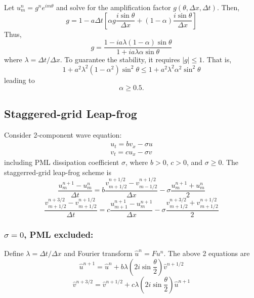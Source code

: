 Let $u_m^n=g^n e^{im\theta}$ and solve for the amplification factor $g(\theta,\Delta x, \Delta t)$. Then,
\begin{equation}
 g=1-a\Delta t \left[
 \alpha g \frac{i\sin\theta}{\Delta x}+(1-\alpha)\frac{i\sin\theta}{\Delta x}
 \right]
\end{equation}
Thus,
\begin{equation}
 g=\frac{1-ia\lambda(1-\alpha)\sin\theta}{1+ia\lambda\alpha\sin\theta}
\end{equation}
where $\lambda=\Delta t/\Delta x$. To guarantee the stability, it requires $|g|\leq 1$. That is,
\begin{equation}
 1+a^2\lambda^2(1-\alpha^2)\sin^2\theta \leq 1+a^2 \lambda^2\alpha^2\sin^2\theta
\end{equation}
leading to
\begin{equation}
 \alpha\geq 0.5.
\end{equation}


\subsection{Staggered-grid Leap-frog}
Consider 2-component wave equation:
\begin{gather}
u_t=b v_x-\sigma u\\
v_t=c u_x-\sigma v 
\end{gather}
including PML dissipation coefficient $\sigma$, where $b>0$, $c>0$, and $\sigma\geq 0$. The staggerred-grid leap-frog scheme is
\begin{equation}\label{eq:pml1}
 \frac{u_m^{n+1}-u_m^n}{\Delta t}=b\frac{v_{m+1/2}^{n+1/2}-v_{m-1/2}^{n+1/2}}{\Delta x}-\sigma \frac{u_m^{n+1}+u_m^n}{2}
\end{equation}
\begin{equation}\label{eq:pml2}
 \frac{v_{m+1/2}^{n+3/2}-v_{m+1/2}^{n+1/2}}{\Delta t}=c \frac{u_{m+1}^{n+1}-u_m^{n+1}}{\Delta x}-\sigma \frac{v_{m+1/2}^{n+3/2}+v_{m+1/2}^{n+1/2}}{2}
\end{equation}

\subsubsection{$\sigma=0$, PML excluded:}

Define $\lambda=\Delta t/\Delta x$ and Fourier transform $\hat{u}^n=F{u^n}$. The above 2 equations are
\begin{equation}
 \hat{u}^{n+1}=\hat{u}^n+b\lambda(2i\sin\frac{\theta}{2})\hat{v}^{n+1/2}
\end{equation}
\begin{equation}
 \hat{v}^{n+3/2}=\hat{v}^{n+1/2}+c\lambda(2i\sin\frac{\theta}{2})\hat{u}^{n+1}
\end{equation}

